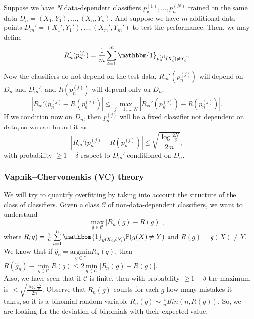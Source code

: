 \documentclass[11pt, english]{article}
\begin{document}
Suppose we have $N$ data-dependent classifiers $p_n^{(1)},\dots,p_n^{(N)}$ trained on the same data $D_n=(X_1,Y_1),\dots,(X_n,Y_n)$. And suppose we have $m$ additional data points $D_m'=(X_1',Y_1'),\dots,(X_m',Y_m')$ to test the performance. Then, we may define \begin{equation}
	R_n'(p_n^{(j)})=\frac{1}{m}\sum\limits_{i=1}^m\mathbbm{1}_{p_n^{(j)}(X_i')\neq Y_i'}.
\end{equation}
Now the classifiers do not depend on the test data, $R_m'(p_n^{(j)})$ will depend on $D_n$ and $D_m'$, and $R(p_n^{(j)})$ will depend only on $D_n$.
\begin{equation}
	|R_m'(p_n^{(j)}-R(p_n^{(j)})|\leq \underset{j=1,\dots,N}{\max}|R_m'(p_n^{(j)})-R(p_n^{(j)})|.
\end{equation}
If we condition now on $D_n$, then $p_n^{(j)}$ will be a fixed classifier not dependent on data, so we can bound it as
\begin{equation}
	|R_m'(p_n^{(j)}-R(p_n^{(j)})|\leq \sqrt{\frac{\log\frac{2N}{\delta}}{2m}},
\end{equation}
with probability $\geq 1-\delta$ respect to $D_m'$ conditioned on $D_n$. \\

\subsubsection{Vapnik–Chervonenkis (VC) theory}

We will try to quantify overfitting by taking into account the structure of the class of classifiers. Given a class $\mathcal{C}$ of non-data-dependent classifiers, we want to understand 
\begin{equation}
	\underset{g\in\mathcal{C}}{\max}|R_n(g)-R(g)|,
\end{equation}
where $R_(g)=\frac{1}{n}\sum\limits_{i=1}^n\mathbbm{1}_{g(X_i\neq Y_i)}\mathbb{P}(g(X)\neq Y)$ and $R(g)=g(X)\neq Y$. We know that if $\hat{g}_n=\underset{g\in\mathcal{C}}{\text{argmin}}R_n(g)$, then $R(\hat{g}_n)-\underset{g\in\mathcal{C}}{\min}R(g)\leq2\underset{g\in\mathcal{C}}{\min}|R_n(g)-R(g)|$.\\

Also, we have seen that if $\mathcal{C}$ is finite, then with probability $\geq 1-\delta$ the maximum is $\leq \sqrt{\frac{\log\frac{2N}{\delta}}{2n}}$. Observe that $R_n(g)$ counts for each $g$ how many mistakes it takes, so it is a binomial random variable $R_n(g)\sim \frac{1}{n}Bin(n,R(g))$. So, we are looking for the deviation of binomials with their expected value.\\
\end{document}
